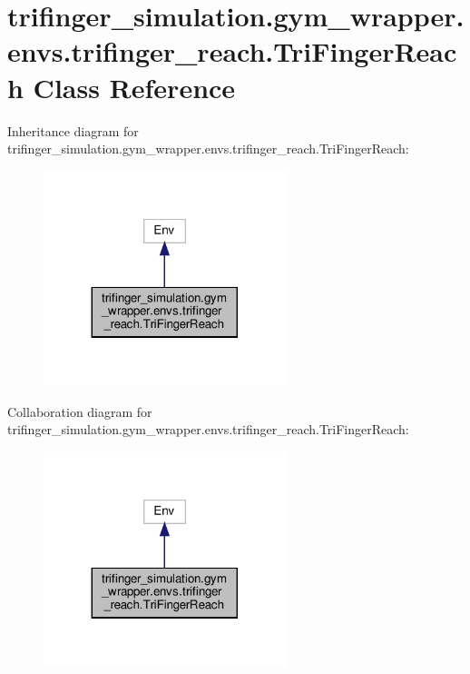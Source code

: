 \hypertarget{classtrifinger__simulation_1_1gym__wrapper_1_1envs_1_1trifinger__reach_1_1TriFingerReach}{}\section{trifinger\+\_\+simulation.\+gym\+\_\+wrapper.\+envs.\+trifinger\+\_\+reach.\+Tri\+Finger\+Reach Class Reference}
\label{classtrifinger__simulation_1_1gym__wrapper_1_1envs_1_1trifinger__reach_1_1TriFingerReach}


Inheritance diagram for trifinger\+\_\+simulation.\+gym\+\_\+wrapper.\+envs.\+trifinger\+\_\+reach.\+Tri\+Finger\+Reach\+:
\nopagebreak
\begin{figure}[H]
\begin{center}
\leavevmode
\includegraphics[width=200pt]{classtrifinger__simulation_1_1gym__wrapper_1_1envs_1_1trifinger__reach_1_1TriFingerReach__inherit__graph}
\end{center}
\end{figure}


Collaboration diagram for trifinger\+\_\+simulation.\+gym\+\_\+wrapper.\+envs.\+trifinger\+\_\+reach.\+Tri\+Finger\+Reach\+:
\nopagebreak
\begin{figure}[H]
\begin{center}
\leavevmode
\includegraphics[width=200pt]{classtrifinger__simulation_1_1gym__wrapper_1_1envs_1_1trifinger__reach_1_1TriFingerReach__coll__graph}
\end{center}
\end{figure}
